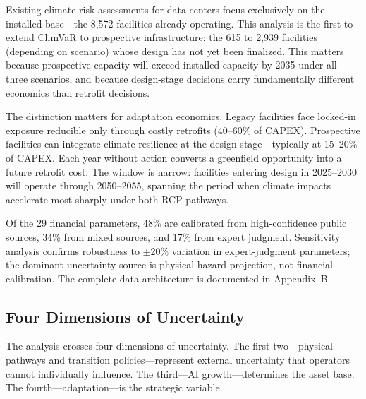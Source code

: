 \begin{twocolbody}

\noindent Existing climate risk assessments for data centers focus exclusively on the installed base---the 8,572 facilities already operating. This analysis is the first to extend ClimVaR to prospective infrastructure: the 615 to 2,939 facilities (depending on scenario) whose design has not yet been finalized. This matters because prospective capacity will exceed installed capacity by 2035 under all three scenarios, and because design-stage decisions carry fundamentally different economics than retrofit decisions.

The distinction matters for adaptation economics. Legacy facilities face locked-in exposure reducible only through costly retrofits (40--60\% of CAPEX). Prospective facilities can integrate climate resilience at the design stage---typically at 15--20\% of CAPEX. Each year without action converts a greenfield opportunity into a future retrofit cost. The window is narrow: facilities entering design in 2025--2030 will operate through 2050--2055, spanning the period when climate impacts accelerate most sharply under both RCP pathways.

Of the 29 financial parameters, 48\% are calibrated from high-confidence public sources, 34\% from mixed sources, and 17\% from expert judgment. Sensitivity analysis confirms robustness to $\pm$20\% variation in expert-judgment parameters; the dominant uncertainty source is physical hazard projection, not financial calibration. The complete data architecture is documented in Appendix~B.

\end{twocolbody}

\clearpage\thispagestyle{chapterstart}


\subsection*{Four Dimensions of Uncertainty}\label{toc:scenarios}
\greensep

\begin{twocolbody}

\noindent The analysis crosses four dimensions of uncertainty. The first two---physical pathways and transition policies---represent external uncertainty that operators cannot individually influence. The third---AI growth---determines the asset base. The fourth---adaptation---is the strategic variable.

\end{twocolbody}

